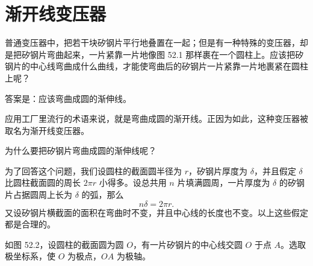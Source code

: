 \section{渐开线变压器}

\noindent
\begin{minipage}[c]{0.57\textwidth}
  \hspace*{2em}普通变压器中，把若干块矽钢片平行地叠置在一起；但是有一种特殊的变压器，却是把矽钢片弯曲起来，一片紧靠一片地像图 52.1 那样裹在一个圆柱上。应该把矽钢片的中心线弯曲成什么曲线，才能使弯曲后的矽钢片一片紧靠一片地裹紧在圆柱上呢？
\end{minipage}\hfill
\begin{minipage}[c]{0.40\textwidth}
  \centering
\end{minipage}

\medskip

答案是：应该弯曲成圆的渐伸线。

应用工厂里流行的术语来说，就是弯曲成圆的渐开线。正因为如此，这种变压器被取名为渐开线变压器。

为什么要把矽钢片弯曲成圆的渐伸线呢？

为了回答这个问题，我们设圆柱的截面圆半径为 $r$，矽钢片厚度为 $\delta$，并且假定 $\delta$ 比圆柱截面圆的周长 $2\pi r$ 小得多。设总共用 $n$ 片填满圆周，一片厚度为 $\delta$ 的矽钢片占据圆周上长为 $\delta$ 的弧，那么
\[
  n\delta = 2\pi r.
\]
又设矽钢片横截面的面积在弯曲时不变，并且中心线的长度也不变。以上这些假定都是合理的。

如图 52.2，设圆柱的截面圆为圆 $O$，有一片矽钢片的中心线交圆 $O$ 于点 $A$。选取极坐标系，使 $O$ 为极点，$OA$ 为极轴。

